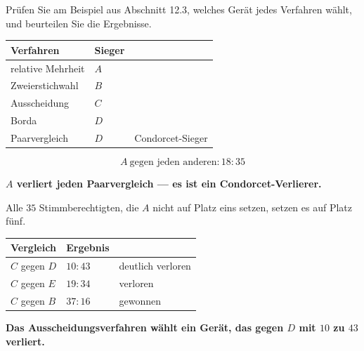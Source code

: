 \begin{aufgabe}
Prüfen Sie am Beispiel aus Abschnitt 12.3, welches Gerät jedes Verfahren wählt, und beurteilen Sie die Ergebnisse.

\loesung
{}
\begin{center}
{\small
\renewcommand{\arraystretch}{1.5}
\begin{tabular}{@{}P{3.0cm}P{1.4cm}P{3.0cm}@{}}
\toprule
\textbf{Verfahren} & \textbf{Sieger} & \\
\midrule
relative Mehrheit & $A$ & \\
Zweierstichwahl & $B$ & \\
Ausscheidung & $C$ & \\
Borda & $D$ & \\
Paarvergleich & $D$ & Condorcet-Sieger\\
\bottomrule
\end{tabular}}
\end{center}

\[ A \ \text{gegen jeden anderen}: 18:35 \]

\begin{center}
\begin{minipage}{0.9\textwidth}
\textbf{$A$ verliert jeden Paarvergleich --- es ist ein Condorcet-Verlierer.}
\end{minipage}
\end{center}

 Alle $35$ Stimmberechtigten, die $A$ nicht auf Platz eins setzen, setzen es auf Platz fünf.

\begin{center}
\renewcommand{\arraystretch}{1.48}
\begin{tabular}{@{}P{2.4cm}P{2.0cm}P{2.6cm}@{}}
\toprule
\textbf{Vergleich} & \textbf{Ergebnis} & \\
\midrule
$C$ gegen $D$ & $10:43$ & deutlich verloren\\
$C$ gegen $E$ & $19:34$ & verloren\\
$C$ gegen $B$ & $37:16$ & gewonnen\\
\bottomrule
\end{tabular}
\end{center}

\begin{center}
\begin{minipage}{0.9\textwidth}
\textbf{Das Ausscheidungsverfahren wählt ein Gerät, das gegen $D$ mit $10$ zu $43$ verliert.}
\end{minipage}
\end{center}


\end{aufgabe}

